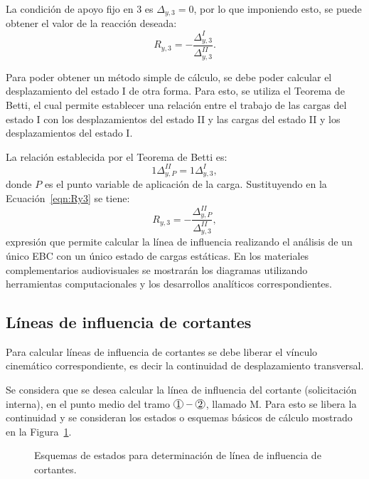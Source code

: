 La condición de apoyo fijo en 3 es $\Delta_{y,3}=0$, por lo que imponiendo esto, se puede obtener el valor de la reacción deseada:
%
\begin{equation}\label{eqn:Ry3}
  R_{y,3} = - \frac{\Delta_{y,3}^I}{ \Delta_{y,3}^{II}}.
\end{equation}

Para poder obtener un método simple de cálculo, se debe poder calcular el desplazamiento del estado I de otra forma. Para esto, se utiliza el Teorema de Betti, el cual permite establecer una relación entre el trabajo de las cargas del estado I con los desplazamientos del estado II y las cargas del estado II y los desplazamientos del estado I.

La relación establecida por el Teorema de Betti es:
%
\begin{equation}
1 \Delta_{y,P}^{II} = 1 \Delta_{y,3}^{I},
\end{equation}
donde $P$ es el punto variable de aplicación de la carga. %
%
Sustituyendo en la Ecuación~\eqref{eqn:Ry3} se tiene:
%
\begin{equation}
\boxed{
R_{y,3} = - \frac{\Delta_{y,P}^{II}}{ \Delta_{y,3}^{II}},
}
\end{equation}
%
expresión que permite calcular la línea de influencia realizando el análisis de un único EBC con un único estado de cargas estáticas.
%
En los materiales complementarios audiovisuales se mostrarán los diagramas utilizando herramientas computacionales y los desarrollos analíticos correspondientes.


\subsection{Líneas de influencia de cortantes}

Para calcular líneas de influencia de cortantes se debe liberar el vínculo cinemático correspondiente, es decir la continuidad de desplazamiento transversal.

Se considera que se desea calcular la línea de influencia del cortante (solicitación interna), en el punto medio del tramo $\circled{1}-\circled{2}$, llamado M. Para esto se libera la continuidad y se consideran los estados o esquemas básicos de cálculo mostrado en la Figura~\ref{fig:ejemLIVM}. 

\begin{figure}[htb]
	\centering
	\def\svgwidth{0.9\textwidth}
	
	\caption{Esquemas de estados para determinación de línea de influencia de cortantes.}
	\label{fig:ejemLIVM}
\end{figure}

